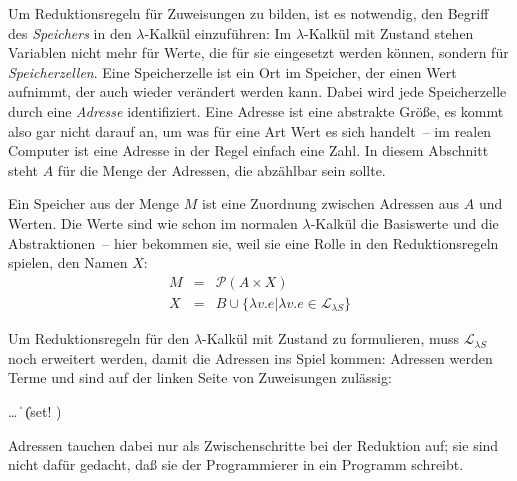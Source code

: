 Um Reduktionsregeln für Zuweisungen zu bilden, ist es notwendig, den
Begriff des \textit{Speichers} in den $\lambda$-Kalkül
einzuführen: Im $\lambda$-Kalkül mit Zustand stehen Variablen nicht
mehr für Werte, die für sie eingesetzt werden können, sondern für
\textit{Speicherzellen}.  Eine Speicherzelle ist
ein Ort im Speicher, der einen Wert aufnimmt, der auch wieder
verändert werden kann.  Dabei wird jede Speicherzelle durch eine
\textit{Adresse} identifiziert.  Eine Adresse ist eine
abstrakte Größe, es kommt also gar nicht darauf an, um was für
eine Art Wert es sich handelt~-- im realen Computer ist eine Adresse
in der Regel einfach eine Zahl.  In diesem Abschnitt steht $A$ für die
Menge der Adressen, die abzählbar sein sollte.

Ein Speicher aus der Menge $M$ ist eine Zuordnung zwischen Adressen aus $A$
und Werten.  Die Werte sind wie schon im normalen
$\lambda$-Kalkül die Basiswerte und die Abstraktionen~-- hier bekommen
sie, weil sie eine Rolle in den Reduktionsregeln spielen, den Namen
$X$:
%
\begin{eqnarray*}
  M &=& \mathcal{P}(A\times X)\\
  X &=& B \cup \{ \lambda v.e | \lambda v.e \in \mathcal{L}_{\lambda{}S} \}
\end{eqnarray*}

Um Reduktionsregeln für den $\lambda$-Kalkül mit Zustand zu
formulieren, muss $\mathcal{L}_{\lambda{}S}$ noch erweitert werden,
damit die Adressen ins Spiel kommen: Adressen werden Terme und sind
auf der linken Seite von Zuweisungen zulässig:
%
\begin{grammar}
   \: \ldots
  \> \| 
  \> \| (set!  )
\end{grammar}
%
Adressen tauchen dabei nur als Zwischenschritte bei der Reduktion auf;
sie sind nicht dafür gedacht, daß sie der Programmierer in ein
Programm schreibt.

